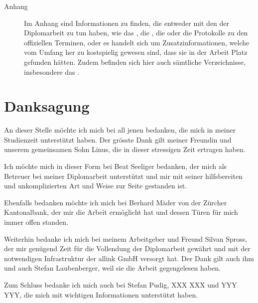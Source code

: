 \begin{description}
  \item[Anhang]
  
  Im Anhang sind Informationen zu finden, die entweder mit den
   der Diplomarbeit zu tun haben, wie das
  , die , die
   oder die Protokolle zu den offiziellen
  Terminen, oder es handelt sich um Zusatzinformationen, welche vom Umfang her
  zu kostspielig gewesen sind, dass sie in der Arbeit Platz gefunden hätten.
  Zudem befinden sich hier auch sämtliche Verzeichnisse, insbesondere das
  \bibname.
  
  \end{description}
  
  \section{Danksagung}
  
  An dieser Stelle möchte ich mich bei all jenen bedanken, die mich in meiner
  Studienzeit unterstützt haben. Der grösste Dank gilt meiner Freundin und
  unserem gemeinsamen Sohn Linus, die in dieser stressigen Zeit ertragen haben.
  
  Ich möchte mich in dieser Form bei Beat Seeliger bedanken, der mich als
  Betreuer bei meiner Diplomarbeit unterstützt und mir mit seiner hilfsbereiten
  und unkomplizierten Art und Weise zur Seite gestanden ist.
  
  Ebenfalls bedanken möchte ich mich bei Berhard Mäder von der Zürcher
  Kantonalbank, der mir die Arbeit ermöglicht hat und dessen Türen für mich
  immer offen standen.
  
  Weiterhin bedanke ich mich bei meinem Arbeitgeber und Freund Silvan Spross,
  der mir genügend Zeit für die Vollendung der Diplomarbeit gewährt und mit der
  notwendigen Infrastruktur der allink GmbH versorgt hat. Der Dank gilt
  auch ihm und auch Stefan Laubenberger, weil sie die Arbeit gegengelesen
  haben.
  
  Zum Schluss bedanke ich mich auch bei Stefan Pudig, XXX XXX und YYY YYY, die
  mich mit wichtigen Informationen unterstützt haben.
    